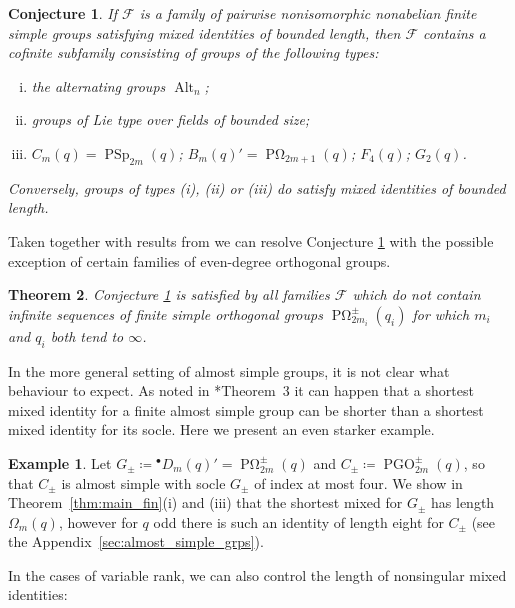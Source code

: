 \documentclass[a4paper,12pt]{amsproc}
\DeclareMathOperator{\PSp}{PSp}%
\DeclareMathOperator{\POmega}{P\Omega}%
\DeclareMathOperator{\PGO}{PGO}%
\DeclareMathOperator{\Alt}{Alt}%
\theoremstyle{plain}
\newtheorem{thmintro}{Theorem}
\newtheorem{conjintro}[thmintro]{Conjecture}
\theoremstyle{definition}
\newtheorem{example}[definition]{Example}
\begin{document}
\begin{conjintro} \label{IntroFSGMainConj}
If $\mathcal{F}$ is a family of pairwise nonisomorphic nonabelian finite simple groups satisfying mixed identities of bounded length, then $\mathcal{F}$ contains a cofinite subfamily 
consisting of groups of the following types: 
\begin{enumerate}[(i)]
\item the alternating groups $\Alt_n$; 
\item groups of Lie type over fields of bounded size; 
\item $C_m(q)=\PSp_{2m}(q)$; 
$B_m(q)'=\POmega_{2m+1}(q)$; $F_4 (q)$; 
$G_2(q)$. 
\end{enumerate}
Conversely, groups of types (i), (ii) or (iii) 
do satisfy mixed identities of bounded length.
\end{conjintro}

Taken together with results from \cite{bradfordschneiderthom2023length} we 
can resolve Conjecture \ref{IntroFSGMainConj} with the possible exception of 
certain families of even-degree orthogonal groups.

\begin{thmintro} \label{thm:OrthCaseImpliesConj}
Conjecture \ref{IntroFSGMainConj} is satisfied by all families $\mathcal{F}$ 
which do not contain infinite sequences of finite simple orthogonal groups 
$\POmega_{2m_i}^\pm(q_i)$ for which $m_i$ and $q_i$ both tend to $\infty$.
\end{thmintro}

In the more general setting of almost simple groups, it is not clear what behaviour to expect. As noted in \cite{bradfordschneiderthom2023length}*{Theorem~3} it can happen that a shortest mixed identity for a finite almost simple group 
can be shorter than a shortest mixed identity for its socle. Here we present an even starker example.

\begin{example}
Let $G_{\pm}\coloneqq{}^\bullet D_m(q)'=\POmega_{2m}^\pm(q)$ and $C_{\pm}\coloneqq\PGO_{2m}^\pm(q)$, so that $C_{\pm}$ is almost simple with socle $G_{\pm}$ of index at most four. We show in Theorem~\ref{thm:main_fin}(i) and (iii) that the shortest mixed for $G_{\pm}$ has length $\Omega_m(q)$, however for $q$ odd there is such an identity of length eight for $C_{\pm}$ (see the Appendix~\ref{sec:almost_simple_grps}). 
\end{example}

In the cases of variable rank, we can also control the length of nonsingular mixed identities:
\end{document}
